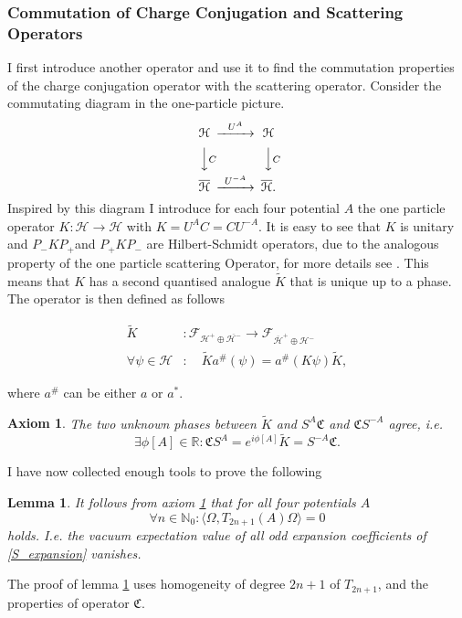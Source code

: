 \documentclass[b5paper,draft,openbib,12pt]{memoir}
\newtheorem{axiom}{Axiom}
\newtheorem{lemma}{Lemma}
\begin{document}
\subsubsection{Commutation of Charge Conjugation and Scattering Operators}
I first introduce another operator and use it to find the commutation properties of the charge conjugation operator with the scattering operator. Consider the commutating diagram in the one-particle picture.
\begin{equation}
\begin{CD}							
 \mathcal{H}     @>U^A>>  \mathcal{H}\\
@VVCV        @VVCV\\
\overline{\mathcal{H}}    @>U^{-A}>> \overline{ \mathcal{H}} .
\end{CD}
\end{equation}
Inspired by this diagram I introduce for each four potential \(A\) the one particle operator \(K: \mathcal{H}\rightarrow\mathcal{H}\) with \(K=U^AC=C U^{-A}\). It is easy to see that \(K\) is unitary and \( P_- K P_+\)and \( P_+ K P_-\) are Hilbert-Schmidt operators, due to the analogous property of the one particle scattering Operator, for more details see \cite{ivp0}. This means that \(K\) has a second quantised analogue \(\tilde{K}\) that is unique up to a phase. The operator is then defined as follows


\begin{align}
\tilde{K} &: \mathcal{F}_{\mathcal{H}^{+}\oplus \overline{\mathcal{H}^{-}}} \rightarrow  \mathcal{F}_{\overline{\mathcal{H}}^{+}\oplus \mathcal{H}^{-}}\\
\forall \psi \in \mathcal{H}&: \quad \tilde{K}a^{\#}(\psi)=a^{\#}(K\psi)\tilde{K},
\end{align}

where \(a^{\#}\) can be either \(a\) or \(a^*\).

\begin{axiom}\label{SC_CS} The two unknown phases between \(\tilde{K}\) and \(S^A \mathfrak{C}\) and \(\mathfrak{C}S^{-A}\) agree, i.e.
\begin{equation}
    \exists \phi[A]\in\mathbb R:  \mathfrak{C}S^A=e^{i\phi[A]} \tilde{K}=S^{-A} \mathfrak{C}.
\end{equation}
\end{axiom}
I have now collected enough tools to prove the following
\begin{lemma}\label{vacuum_expectation_odd}
It follows from axiom \ref{SC_CS} that for all four potentials \(A\)
\begin{equation}
\forall n\in\mathbb{N}_0: \langle \Omega, T_{2n+1}(A) \Omega \rangle=0
\end{equation}
holds. I.e. the vacuum expectation value of all odd expansion coefficients of \eqref{S_expansion} vanishes.
\end{lemma}
The proof of lemma \ref{vacuum_expectation_odd} uses homogeneity of degree
\(2n+1\) of \(T_{2n+1}\), and the properties of operator \(\mathfrak{C}\).
\end{document}
